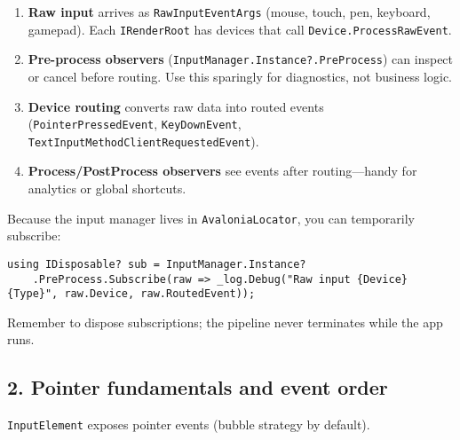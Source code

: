 \begin{enumerate}
\def\labelenumi{\arabic{enumi}.}
\tightlist
\item
  \textbf{Raw input} arrives as
  \passthrough{\lstinline!RawInputEventArgs!} (mouse, touch, pen,
  keyboard, gamepad). Each \passthrough{\lstinline!IRenderRoot!} has
  devices that call \passthrough{\lstinline!Device.ProcessRawEvent!}.
\item
  \textbf{Pre-process observers}
  (\passthrough{\lstinline!InputManager.Instance?.PreProcess!}) can
  inspect or cancel before routing. Use this sparingly for diagnostics,
  not business logic.
\item
  \textbf{Device routing} converts raw data into routed events
  (\passthrough{\lstinline!PointerPressedEvent!},
  \passthrough{\lstinline!KeyDownEvent!},
  \passthrough{\lstinline!TextInputMethodClientRequestedEvent!}).
\item
  \textbf{Process/PostProcess observers} see events after
  routing---handy for analytics or global shortcuts.
\end{enumerate}

Because the input manager lives in
\passthrough{\lstinline!AvaloniaLocator!}, you can temporarily
subscribe:

\begin{lstlisting}
using IDisposable? sub = InputManager.Instance?
    .PreProcess.Subscribe(raw => _log.Debug("Raw input {Device} {Type}", raw.Device, raw.RoutedEvent));
\end{lstlisting}

Remember to dispose subscriptions; the pipeline never terminates while
the app runs.

\subsection{2. Pointer fundamentals and event
order}\label{pointer-fundamentals-and-event-order}

\passthrough{\lstinline!InputElement!} exposes pointer events (bubble
strategy by default).

